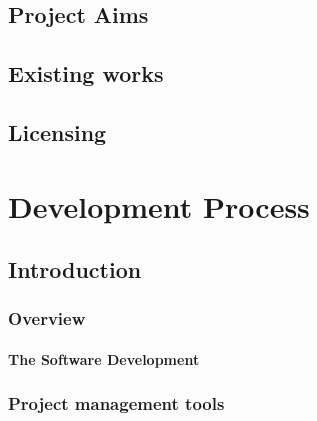\section{Project Aims}
\section{Existing works}
\section{Licensing}
\chapter{Development Process}
\section{Introduction}
\subsection{Overview}
\subsubsection{The Software Development}
\subsection{Project management tools}
